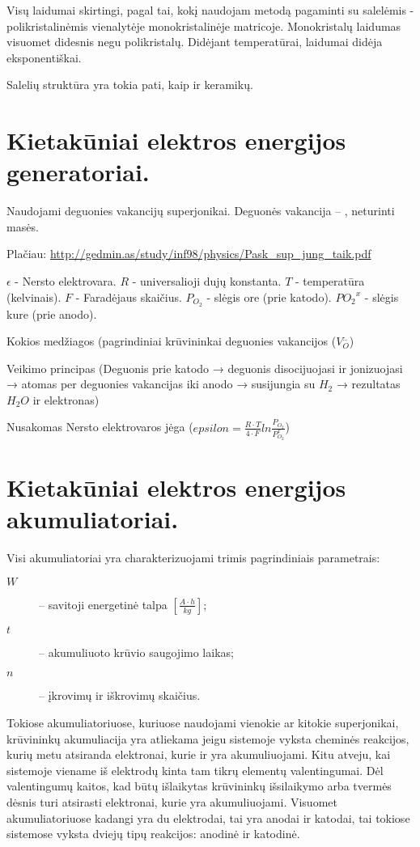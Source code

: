 Visų laidumai skirtingi, pagal tai,
kokį naudojam metodą pagaminti su salelėmis - polikristalinėmis vienalytėje monokristalinėje matricoje.
Monokristalų laidumas visuomet didesnis negu polikristalų.
Didėjant temperatūrai, laidumai didėja eksponentiškai.

Salelių struktūra yra tokia pati, kaip ir keramikų.

\section{Kietakūniai elektros energijos generatoriai.}
Naudojami deguonies vakancijų superjonikai. Deguonės vakancija – ,
neturinti masės.

Plačiau: \url{http://gedmin.as/study/inf98/physics/Pask_sup_jung_taik.pdf}

$\epsilon$ - Nersto elektrovara.
$R$ - universalioji dujų konstanta.
$T$ - temperatūra (kelvinais).
$F$ - Faradėjaus skaičius.
$P_{O_2}$ - slėgis ore (prie katodo).
$P{O_2}^x$ - slėgis kure (prie anodo).

\begin{remember}
  \item Kokios medžiagos (pagrindiniai krūvininkai deguonies vakancijos
  ($V_{O}^{..}$) 
  \item Veikimo principas (Deguonis prie katodo → deguonis
  disocijuojasi ir jonizuojasi →  atomas per deguonies vakancijas
  iki anodo → susijungia su $H_2$ → rezultatas $H_2 O$ ir elektronas)
  \item Nusakomas Nersto elektrovaros jėga
  ($epsilon = \frac{R \cdot T}{4 \cdot F}ln \frac{P_{O_2}}{P_{O_2}^x}$)
\end{remember}

\section{Kietakūniai elektros energijos akumuliatoriai.}

Visi akumuliatoriai yra charakterizuojami trimis pagrindiniais parametrais:
\begin{description}
  \item[$W$]  – savitoji energetinė talpa
    $\left[ \frac{A \cdot h}{kg} \right]$;
  \item[$t$] – akumuliuoto krūvio saugojimo laikas;
  \item[$n$] – įkrovimų ir iškrovimų skaičius.
\end{description}

Tokiose akumuliatoriuose, kuriuose naudojami vienokie ar kitokie
superjonikai, krūvininkų akumuliacija yra atliekama jeigu sistemoje
vyksta cheminės reakcijos, kurių metu atsiranda elektronai, kurie
ir yra akumuliuojami. Kitu atveju, kai sistemoje viename iš
elektrodų kinta tam tikrų elementų valentingumai. Dėl valentingumų
kaitos, kad būtų išlaikytas krūvininkų išsilaikymo arba tvermės
dėsnis turi atsirasti elektronai, kurie yra akumuliuojami.
Visuomet akumuliatoriuose kadangi yra du elektrodai, tai yra anodai
ir katodai, tai tokiose sistemose vyksta dviejų tipų reakcijos:
anodinė ir katodinė.

